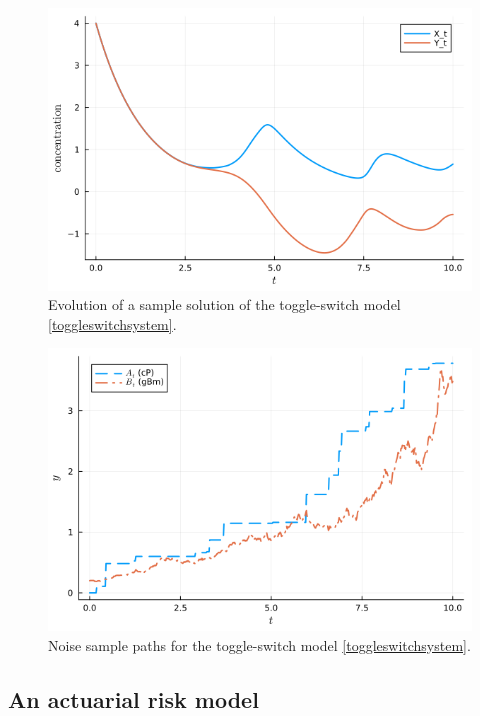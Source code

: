 \documentclass[reqno,12pt]{amsart}
\theoremstyle{plain} %
\theoremstyle{definition} %
\begin{document}
\begin{figure}[htb]
    \includegraphics[scale=0.4]{img/evolution_toggleswitch.png}
    \caption{Evolution of a sample solution of the toggle-switch model \eqref{toggleswitchsystem}.}
    \label{figtoggleswitchevolution}
\end{figure}

\begin{figure}[htb]
    \includegraphics[scale=0.4]{img/noises_toggleswitch.png}
    \caption{Noise sample paths for the toggle-switch model \eqref{toggleswitchsystem}.}
    \label{figtoggleswitchnoise}
\end{figure}

\subsection{An actuarial risk model}
\end{document}
